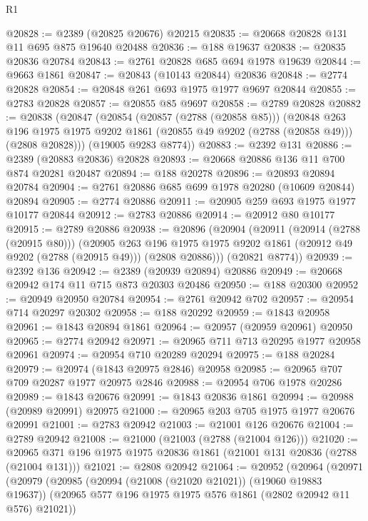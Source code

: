 \begin{lexlean}{R1}
\begin{coremodule}
@20828 := @2389 (@20825 @20676) @20215
@20835 := @20668 @20828 @131 @11 @695 @875 @19640 @20488
@20836 := @188 @19637
@20838 := @20835 @20836 @20784
@20843 := @2761 @20828 @685 @694 @1978 @19639
@20844 := @9663 @1861
@20847 := @20843 (@10143 @20844) @20836
@20848 := @2774 @20828
@20854 := @20848 @261 @693 @1975 @1977 @9697 @20844
@20855 := @2783 @20828
@20857 := @20855 @85 @9697
@20858 := @2789 @20828
@20882 := @20838
    (@20847
      (@20854
        (@20857 (@2788 (@20858 @85)))
        (@20848
          @263
          @196
          @1975
          @1975
          @9202
          @1861
          (@20855 @49 @9202 (@2788 (@20858 @49)))
          (@2808 @20828)))
      (@19005 @9283 @8774))
@20883 := @2392 @131
@20886 := @2389 (@20883 @20836) @20828
@20893 := @20668 @20886 @136 @11 @700 @874 @20281 @20487
@20894 := @188 @20278
@20896 := @20893 @20894 @20784
@20904 := @2761 @20886 @685 @699 @1978 @20280 (@10609 @20844) @20894
@20905 := @2774 @20886
@20911 := @20905 @259 @693 @1975 @1977 @10177 @20844
@20912 := @2783 @20886
@20914 := @20912 @80 @10177
@20915 := @2789 @20886
@20938 := @20896
    (@20904
      (@20911
        (@20914 (@2788 (@20915 @80)))
        (@20905
          @263
          @196
          @1975
          @1975
          @9202
          @1861
          (@20912 @49 @9202 (@2788 (@20915 @49)))
          (@2808 @20886)))
      (@20821 @8774))
@20939 := @2392 @136
@20942 := @2389 (@20939 @20894) @20886
@20949 := @20668 @20942 @174 @11 @715 @873 @20303 @20486
@20950 := @188 @20300
@20952 := @20949 @20950 @20784
@20954 := @2761 @20942 @702
@20957 := @20954 @714 @20297 @20302
@20958 := @188 @20292
@20959 := @1843 @20958
@20961 := @1843 @20894 @1861
@20964 := @20957 (@20959 @20961) @20950
@20965 := @2774 @20942
@20971 := @20965 @711 @713 @20295 @1977 @20958 @20961
@20974 := @20954 @710 @20289 @20294
@20975 := @188 @20284
@20979 := @20974 (@1843 @20975 @2846) @20958
@20985 := @20965 @707 @709 @20287 @1977 @20975 @2846
@20988 := @20954 @706 @1978 @20286
@20989 := @1843 @20676
@20991 := @1843 @20836 @1861
@20994 := @20988 (@20989 @20991) @20975
@21000 := @20965 @203 @705 @1975 @1977 @20676 @20991
@21001 := @2783 @20942
@21003 := @21001 @126 @20676
@21004 := @2789 @20942
@21008 := @21000 (@21003 (@2788 (@21004 @126)))
@21020 := @20965 @371 @196 @1975 @1975 @20836 @1861 (@21001 @131 @20836 (@2788 (@21004 @131)))
@21021 := @2808 @20942
@21064 := @20952
    (@20964
      (@20971
        (@20979
          (@20985
            (@20994 (@21008 (@21020 @21021)) (@19060 @19883 @19637))
            (@20965 @577 @196 @1975 @1975 @576 @1861 (@2802 @20942 @11 @576) @21021))

\end{coremodule}
\end{lexlean}
